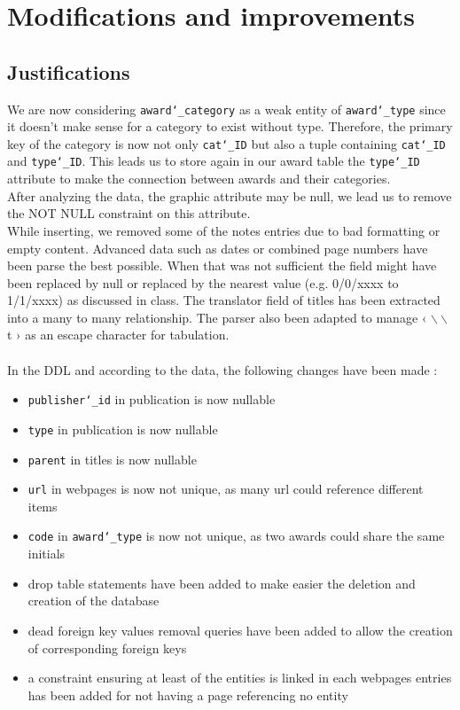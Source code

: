 \documentclass[doubleside, titlepage]{article}
\begin{document}
\section{Modifications and improvements}

\subsection{Justifications}
We are now considering \texttt{award\char`_category} as a weak entity of \texttt{award\char`_type} since it doesn’t make sense for a category to exist without type. Therefore, the primary key of the category is now not only \texttt{cat\char`_ID} but also a tuple containing \texttt{cat\char`_ID} and \texttt{type\char`_ID}. This leads us to store again in our award table the \texttt{type\char`_ID} attribute to make the connection between awards and their categories.
\\
After analyzing the data, the graphic attribute may be null, we lead us to remove the NOT NULL constraint on this attribute.
\\
While inserting, we removed some of the notes entries due to bad formatting or empty content. Advanced data such as dates or combined page numbers have been parse the best possible. When that was not sufficient the field might have been replaced by null or replaced by the nearest value (e.g. 0/0/xxxx to 1/1/xxxx) as discussed in class. The translator field of titles has been extracted into a many to many relationship. The parser also been adapted to manage ‹ $\backslash\backslash$t › as an escape character for tabulation.
~\\~\\
In the DDL and according to the data, the following changes have been made :
\begin{itemize}
	\item \texttt{publisher\char`_id} in publication is now nullable
	\item \texttt{type} in publication is now nullable
	\item \texttt{parent} in titles is now nullable
	\item \texttt{url} in webpages is now not unique, as many url could reference different items
	\item \texttt{code} in \texttt{award\char`_type} is now not unique, as two awards could share the same initials
	\item drop table statements have been added to make easier the deletion and creation of the database
	\item dead foreign key values removal queries have been added to allow the creation of corresponding foreign keys
	\item a constraint ensuring at least of the entities is linked in each webpages entries has been added for not having a page referencing no entity
\end{itemize}
\end{document}
